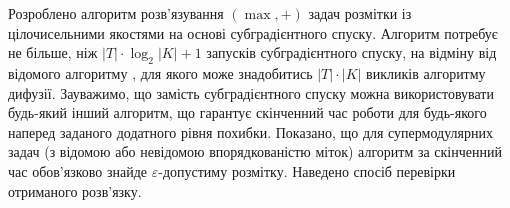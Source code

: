 \chapterConclusion

Розроблено алгоритм розв’язування $(\max ,+)$ задач розмітки із
цілочисельними якостями на основі субградієнтного спуску.
Алгоритм потребує не більше, ніж $|T|\cdot \log_2 |K| + 1$
запусків субградієнтного спуску,
на відміну від відомого алгоритму \cite{diffusion_shlezinger},
для якого може знадобитись $|T|\cdot|K|$ викликів алгоритму дифузії.
Зауважимо, що замість субградієнтного спуску можна використовувати
будь-який інший алгоритм, що гарантує скінченний час роботи
для будь-якого наперед заданого додатного рівня похибки.
Показано, що для
супермодулярних задач (з відомою або невідомою впорядкованістю міток) алгоритм
за скінченний час обов'язково знайде $\varepsilon$-допустиму розмітку.
Наведено спосіб перевірки отриманого розв'язку.
